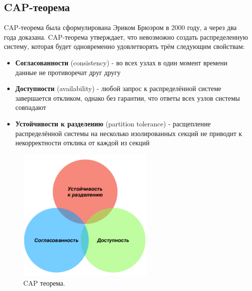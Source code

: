 \documentclass[subf, href, colorlinks=true, 14pt,
times, mtpro, specialist]{disser}
\theoremstyle{definition}
\begin{document}
\subsection{CAP-теорема}\label{CAP_theorem}



CAP-теорема была сформулирована Эриком Брюэром в 2000 году, а через два года доказана. CAP-теорема утверждает, что невозможно создать распределенную систему, которая будет одновременно удовлетворять
трём следующим свойствам:
\begin{itemize}
\item \textbf{Согласованности} (consistency) - во всех узлах в один момент времени данные не противоречат друг другу
\item \textbf{Доступности} (availability) - любой запрос к распределённой системе завершается откликом, однако без гарантии, что ответы всех узлов системы совпадают
\item \textbf{Устойчивости к разделению} (partition tolerance) - расщепление распределённой системы на несколько изолированных секций не приводит к некорректности отклика от каждой из секций
\end{itemize}

\begin{figure}[H]
\label{fig:cap_t}
\centering
\includegraphics[width=0.6\textwidth]{src/pics/CAP_t.png}
\caption{CAP теорема.}
\end{figure}
\end{document}

